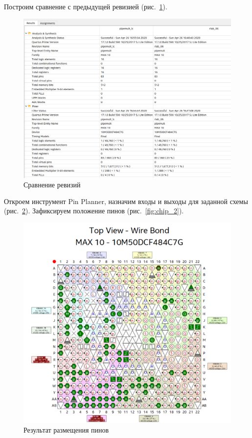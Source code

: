 \documentclass[a4paper,14pt]{article}
\begin{document}
Построим сравнение с предыдущей ревизией (рис.~\ref{fig:diff}).

\begin{figure}[H]
	\centering
	\includegraphics[width=\linewidth]{image/diff}
	\caption{Сравнение ревизий}
	\label{fig:diff}
\end{figure}

Откроем инструмент Pin Planner, назначим входы и выходы для заданной схемы (рис.~\ref{fig:chip_1}).
Зафиксируем положение пинов (рис.~\ref{fig:chip_2}).

\begin{figure}[H]
	\centering
	\includegraphics[width=\linewidth]{image/chip_1}
	\caption{Результат размещения пинов}
	\label{fig:chip_1}
\end{figure}
\end{document}

